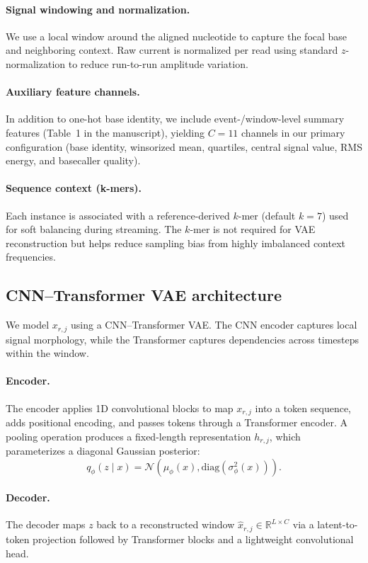 \documentclass[sigconf, review]{acmart}
\begin{document}
\paragraph{Signal windowing and normalization.}
We use a local window around the aligned nucleotide to capture the focal base and neighboring
context. Raw current is normalized per read using standard $z$-normalization to reduce
run-to-run amplitude variation.

\paragraph{Auxiliary feature channels.}
In addition to one-hot base identity, we include event-/window-level summary features (Table~1 in
the manuscript), yielding $C=11$ channels in our primary configuration (base identity, winsorized
mean, quartiles, central signal value, RMS energy, and basecaller quality).

\paragraph{Sequence context (k-mers).}
Each instance is associated with a reference-derived $k$-mer (default $k=7$) used for soft balancing
during streaming. The $k$-mer is not required for VAE reconstruction but helps reduce sampling bias
from highly imbalanced context frequencies.

\subsection{CNN--Transformer VAE architecture}
We model $x_{r,j}$ using a CNN--Transformer VAE. The CNN encoder captures local signal morphology,
while the Transformer captures dependencies across timesteps within the window.

\paragraph{Encoder.}
The encoder applies 1D convolutional blocks to map $x_{r,j}$ into a token sequence, adds positional
encoding, and passes tokens through a Transformer encoder. A pooling operation produces a
fixed-length representation $h_{r,j}$, which parameterizes a diagonal Gaussian posterior:
\begin{equation}
q_\phi(z\mid x) = \mathcal{N}\!\left(\mu_\phi(x),\mathrm{diag}(\sigma_\phi^2(x))\right).
\end{equation}

\paragraph{Decoder.}
The decoder maps $z$ back to a reconstructed window $\hat{x}_{r,j}\in\mathbb{R}^{L\times C}$ via a
latent-to-token projection followed by Transformer blocks and a lightweight convolutional head.
\end{document}
